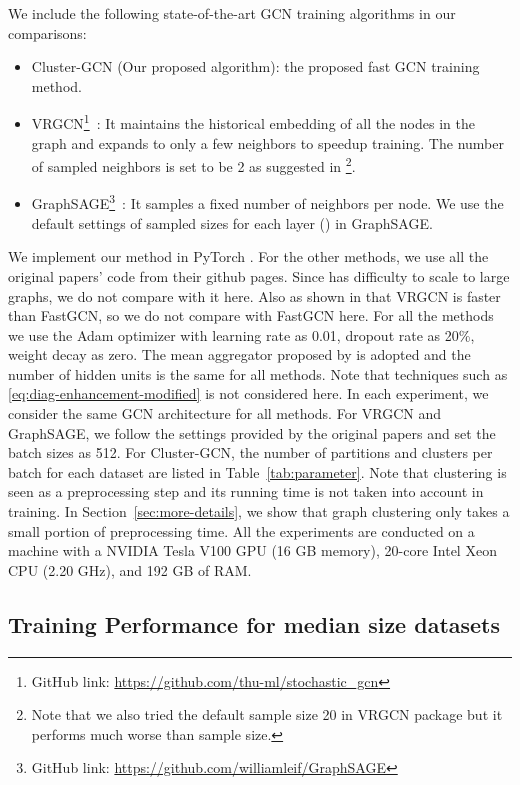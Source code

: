 \documentclass[sigconf]{acmart}
\begin{document}
We include the following state-of-the-art GCN training algorithms in our comparisons: 
\begin{itemize}
\item Cluster-GCN (Our proposed algorithm): the proposed fast GCN training method. 
\item VRGCN\footnote{GitHub link: \url{https://github.com/thu-ml/stochastic_gcn}}~\cite{chen2018stochastic}: It maintains the historical embedding of all the nodes in the graph and expands to only a few neighbors to speedup training. The number of sampled neighbors is set to be 2 as suggested in \cite{chen2018stochastic}\footnote{Note that we also tried the default sample size 20 in VRGCN package but it performs much worse than sample size. }.
\item GraphSAGE\footnote{GitHub link: \url{https://github.com/williamleif/GraphSAGE}}~\citep{hamilton2017inductive}: It samples a fixed number of neighbors per node. We use the default settings of sampled sizes for each layer () in GraphSAGE.
\end{itemize}
We implement our method in PyTorch \cite{paszke2017automatic}. For the other methods, we use all the original papers' code from their github pages. Since \cite{kipf2017semi} has difficulty to scale to large graphs, we do not compare with it here.
Also as shown in \cite{chen2018stochastic} that VRGCN is faster than FastGCN, so we do not compare with FastGCN here.
For all the methods we use the Adam optimizer with learning rate as 0.01, dropout rate as 20\%, weight decay as zero.
The mean aggregator proposed by \cite{hamilton2017inductive} is adopted and the number of hidden units is the same for all methods.
Note that techniques such as \eqref{eq:diag-enhancement-modified} is not considered here.
In each experiment, we consider the same GCN architecture for all methods.
For VRGCN and GraphSAGE, we follow the settings provided by the original papers and set the batch sizes as 512.
For Cluster-GCN, the number of partitions and clusters per batch for each dataset are listed in Table~\ref{tab:parameter}.
Note that clustering is seen as a preprocessing step and its running time is not taken into account in training.
In Section~\ref{sec:more-details}, we show that graph clustering only takes a small portion of preprocessing time.
All the experiments are conducted on a machine with a NVIDIA Tesla V100 GPU (16 GB memory), 20-core Intel Xeon CPU (2.20 GHz), and 192 GB of RAM.



\subsection{Training Performance for median size datasets}
\label{sec:median}
\end{document}
